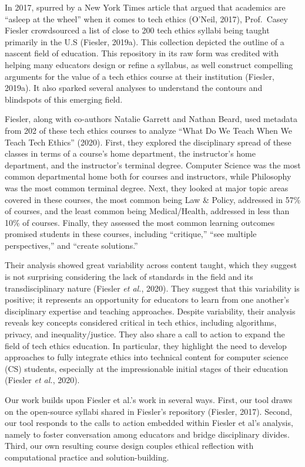 \documentclass[
]{article}
\begin{document}
In 2017, spurred by a New York Times article that argued that academics
are ``asleep at the wheel'' when it comes to tech ethics (O'Neil, 2017),
Prof.~Casey Fiesler crowdsourced a list of close to 200 tech ethics
syllabi being taught primarily in the U.S (Fiesler, 2019a). This
collection depicted the outline of a nascent field of education. This
repository in its raw form was credited with helping many educators
design or refine a syllabus, as well construct compelling arguments for
the value of a tech ethics course at their institution (Fiesler, 2019a).
It also sparked several analyses to understand the contours and
blindspots of this emerging field.

Fiesler, along with co-authors Natalie Garrett and Nathan Beard, used
metadata from 202 of these tech ethics courses to analyze ``What Do We
Teach When We Teach Tech Ethics'' (2020). First, they explored the
disciplinary spread of these classes in terms of a course's home
department, the instructor's home department, and the instructor's
terminal degree. Computer Science was the most common departmental home
both for courses and instructors, while Philosophy was the most common
terminal degree. Next, they looked at major topic areas covered in these
courses, the most common being Law \& Policy, addressed in 57\% of
courses, and the least common being Medical/Health, addressed in less
than 10\% of courses. Finally, they assessed the most common learning
outcomes promised students in these courses, including ``critique,''
``see multiple perspectives,'' and ``create solutions.''

Their analysis showed great variability across content taught, which
they suggest is not surprising considering the lack of standards in the
field and its transdisciplinary nature (Fiesler \emph{et al.}, 2020).
They suggest that this variability is positive; it represents an
opportunity for educators to learn from one another's disciplinary
expertise and teaching approaches. Despite variability, their analysis
reveals key concepts considered critical in tech ethics, including
algorithms, privacy, and inequality/justice. They also share a call to
action to expand the field of tech ethics education. In particular, they
highlight the need to develop approaches to fully integrate ethics into
technical content for computer science (CS) students, especially at the
impressionable initial stages of their education (Fiesler \emph{et al.},
2020).

Our work builds upon Fiesler et al.'s work in several ways. First, our
tool draws on the open-source syllabi shared in Fiesler's repository
(Fiesler, 2017). Second, our tool responds to the calls to action
embedded within Fiesler et al's analysis, namely to foster conversation
among educators and bridge disciplinary divides. Third, our own
resulting course design couples ethical reflection with computational
practice and solution-building.
\end{document}
